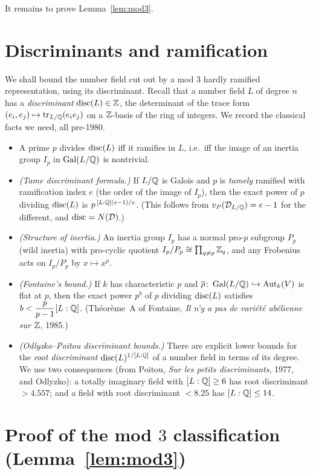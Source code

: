 \documentclass[11pt]{article}
\begin{document}
It remains to prove Lemma~\ref{lem:mod3}.

\section{Discriminants and ramification}

We shall bound the number field cut out by a mod $3$ hardly ramified
representation, using its discriminant. Recall that a number field $L$ of
degree $n$ has a \emph{discriminant} $\operatorname{disc}(L)\in\mathbb{Z}$, the determinant of the
trace form $(e_i,e_j)\mapsto\operatorname{tr}_{L/\mathbb{Q}}(e_ie_j)$ on a $\mathbb{Z}$-basis of the ring of
integers. We record the classical facts we need, all pre-1980.

\begin{itemize}
\item A prime $p$ divides $\operatorname{disc}(L)$ iff it ramifies in $L$, i.e.\ iff the
image of an inertia group $I_p$ in $\operatorname{Gal}(L/\mathbb{Q})$ is nontrivial.
\item \emph{(Tame discriminant formula.)} If $L/\mathbb{Q}$ is Galois and $p$ is
\emph{tamely} ramified with ramification index $e$ (the order of the image of
$I_p$), then the exact power of $p$ dividing $\operatorname{disc}(L)$ is
$p^{\,[L:\mathbb{Q}](e-1)/e}$. \textup{(}This follows from
$v_{P}(\mathcal D_{L/\mathbb{Q}})=e-1$ for the different, and $\operatorname{disc}=N(\mathcal
D)$.\textup{)}
\item \emph{(Structure of inertia.)} An inertia group $I_p$ has a normal
pro-$p$ subgroup $P_p$ \textup{(}wild inertia\textup{)} with pro-cyclic
quotient $I_p/P_p\cong\prod_{q\neq p}\mathbb{Z}_q$, and any Frobenius acts on $I_p/P_p$
by $x\mapsto x^p$.
\item \emph{(Fontaine's bound.)} If $k$ has characteristic $p$ and
$\overline{\rho}\colon\operatorname{Gal}(L/\mathbb{Q})\hookrightarrow\operatorname{Aut}_k(V)$ is flat at $p$, then the
exact power $p^{b}$ of $p$ dividing $\operatorname{disc}(L)$ satisfies
$b<\dfrac{p}{p-1}[L:\mathbb{Q}]$. \textup{(}Th\'eor\`eme~A of Fontaine, \emph{Il n'y a
pas de vari\'et\'e ab\'elienne sur $\mathbb{Z}$}, 1985.\textup{)}
\item \emph{(Odlyzko--Poitou discriminant bounds.)} There are explicit lower
bounds for the \emph{root discriminant} $\operatorname{disc}(L)^{1/[L:\mathbb{Q}]}$ of a number field
in terms of its degree. We use two consequences \textup{(}from Poitou,
\emph{Sur les petits discriminants}, 1977, and Odlyzko\textup{)}: a totally
imaginary field with $[L:\mathbb{Q}]\geq6$ has root discriminant $>4.557$; and a field
with root discriminant $<8.25$ has $[L:\mathbb{Q}]\leq 14$.
\end{itemize}

\section{Proof of the mod $3$ classification (Lemma~\ref{lem:mod3})}
\end{document}
